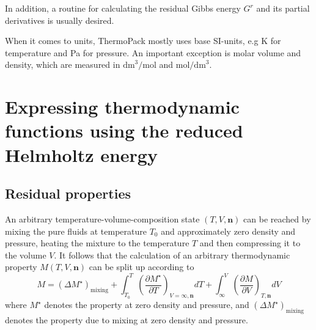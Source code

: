 \documentclass[internal,english]{sintefmemo2012}
\newcommand{\mbn}[0]{\mathbf n}
\newcommand{\lp}{\left(}
\newcommand{\rp}{\right)}
\numberwithin{equation}{section}
\begin{document}
In addition, a routine for calculating the residual Gibbs energy $G^r$
and its partial derivatives is usually desired.

When it comes to units, ThermoPack mostly uses base SI-units, e.g K
for temperature and Pa for pressure. An important exception is
molar volume and density, which are measured in
$\mathrm{dm}^3/\mathrm{mol}$ and $\mathrm{mol}/\mathrm{dm}^3$.



\section{Expressing thermodynamic functions using the reduced Helmholtz energy}

\subsection{Residual properties}
An arbitrary temperature-volume-composition state $(T,V,\mbn)$ can be reached by mixing
the pure fluids at temperature $T_0$ and approximately zero density and
pressure, heating the mixture to the temperature $T$ and then
compressing it to the volume $V$. It follows that the calculation of
an arbitrary thermodynamic property $M(T,V,\mbn)$ can be split up
according to
\begin{equation}
  \label{M_TVN}
  M = (\Delta M^\star)_{\text{mixing}} + \int_{T_0}^T \lp
  \frac{\partial M^\star}{\partial T} \rp_{V=\infty,\mbn} dT +
  \int_{\infty}^V \lp \frac{\partial M}{\partial V} \rp_{T,\mbn} dV
\end{equation}
where $M^\star$ denotes the property at zero density and pressure, and $(\Delta M^\star)_{\text{mixing}}$ denotes the property due to
mixing at zero density and pressure.
\end{document}
